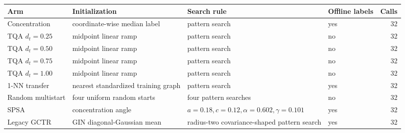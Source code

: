 \begin{tabular}{@{}llllr@{}}
\toprule
Arm & Initialization & Search rule & Offline labels & Calls \\
\midrule
Concentration & coordinate-wise median label & pattern search & yes & 32 \\
TQA $d_t=0.25$ & midpoint linear ramp & pattern search & no & 32 \\
TQA $d_t=0.50$ & midpoint linear ramp & pattern search & no & 32 \\
TQA $d_t=0.75$ & midpoint linear ramp & pattern search & no & 32 \\
TQA $d_t=1.00$ & midpoint linear ramp & pattern search & no & 32 \\
1-NN transfer & nearest standardized training graph & pattern search & yes & 32 \\
Random multistart & four uniform random starts & four pattern searches & no & 32 \\
SPSA & concentration angle & $a=0.18,c=0.12,\alpha=0.602,\gamma=0.101$ & yes & 32 \\
Legacy GCTR & GIN diagonal-Gaussian mean & radius-two covariance-shaped pattern search & yes & 32 \\
\bottomrule
\end{tabular}
